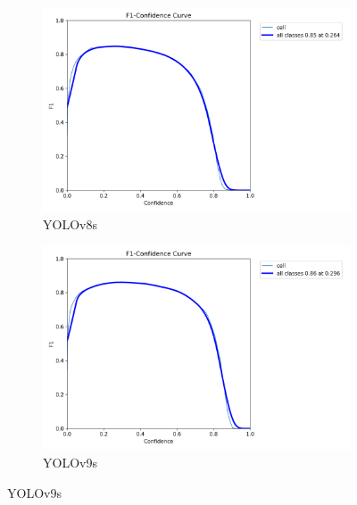 \documentclass[12pt,a4paper,onecolumn,oneside]{report}
\begin{document}
\begin{figure}[H]
  \centering
  \begin{subfigure}[b]{0.48\textwidth}
    \centering
    \includegraphics[width=\textwidth]{figuras/resultados experimentacion/yolov8s/test/BoxF1_curve.png}
    \caption{YOLOv8s}
    \label{fig:yolov8s_test}
  \end{subfigure}
  \hfill
  \begin{subfigure}[b]{0.48\textwidth}
    \centering
    \includegraphics[width=\textwidth]{figuras/resultados experimentacion/yolov9s/test/BoxF1_curve.png}
    \caption{YOLOv9s}
    \label{fig:yolov9s_test}
  \end{subfigure}
  

\end{figure}
\end{document}
